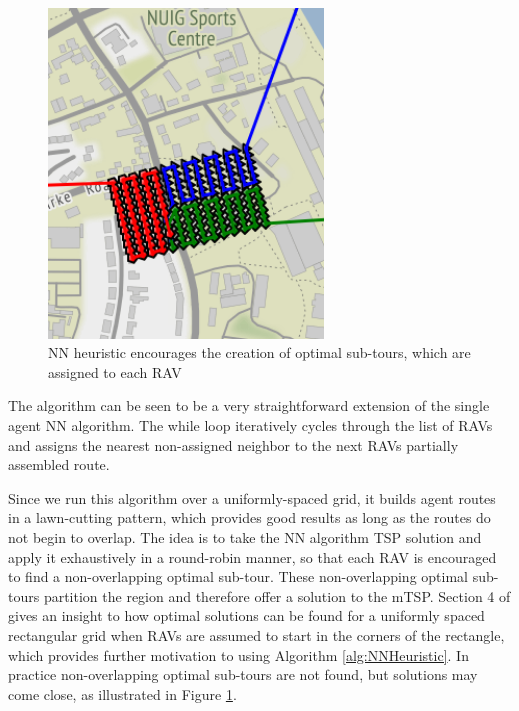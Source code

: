 \begin{figure}[h]
\centering
\includegraphics[width=0.65\textwidth]{Chapters/MultiAgentCoverage/Figs/RAVRoutingNUIGCropped.png}
\caption{NN heuristic encourages the creation of optimal sub-tours, which are assigned to each RAV}
\label{fig:NNPartitioning}
\end{figure}

The algorithm can be seen to be a very straightforward extension of the single agent NN algorithm. The while loop iteratively cycles through the list of RAVs and assigns the nearest non-assigned neighbor to the next RAVs partially assembled route.

Since we run this algorithm over a uniformly-spaced grid, it builds agent routes in a lawn-cutting pattern, which provides good results as long as the routes do not begin to overlap. The idea is to take the NN algorithm TSP solution and apply it exhaustively in a round-robin manner, so that each RAV is encouraged to find a non-overlapping optimal sub-tour. These non-overlapping optimal sub-tours partition the region and therefore offer a solution to the mTSP. Section 4 of \cite{Hungerlander2018TheGrids} gives an insight to how optimal solutions can be found for a uniformly spaced rectangular grid when RAVs are assumed to start in the corners of the rectangle, which provides further motivation to using Algorithm \ref{alg:NNHeuristic}. In practice non-overlapping optimal sub-tours are not found, but solutions may come close, as illustrated in Figure \ref{fig:NNPartitioning}.


